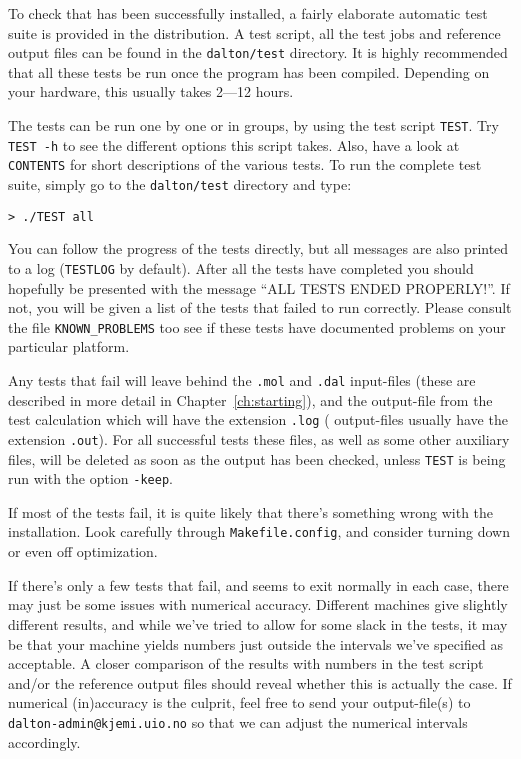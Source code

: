 To check that {\dalton} has been successfully installed, a fairly
elaborate automatic test suite is provided in the distribution. A test
script, all the test jobs and reference output files can be found in
the \verb|dalton/test| directory. It is highly recommended that all
these tests be run once the program has been compiled. Depending on
your hardware, this usually takes 2---12 hours.

The tests can be run one by one or in groups, by using the test script
\verb|TEST|. Try \verb|TEST -h| to see the different options this
script takes. Also, have a look at \verb|CONTENTS|
for short descriptions of the various tests. To run the
complete test suite, simply go to the \verb|dalton/test| directory and
type:
\begin{verbatim}
> ./TEST all
\end{verbatim}
You can follow the progress of the tests directly, but all messages
are also printed to a log (\verb|TESTLOG| by default). After all the
tests have completed you should hopefully be presented with the
message ``ALL TESTS ENDED PROPERLY!''. If not, you will be given a
list of the tests that failed to run correctly. Please consult the file
\verb|KNOWN_PROBLEMS| too see if these tests have documented problems
on your particular platform.

Any tests that fail will leave behind the \verb|.mol| and \verb|.dal|
input-files (these are described in more detail in
Chapter~\ref{ch:starting}), and the output-file from the test
calculation which will have the extension \verb|.log| ({\dalton}
output-files usually have the extension \verb|.out|). For all
successful tests these files, as well as some other auxiliary files,
will be deleted as soon as the output has been checked, unless
\verb|TEST| is being run with the option \verb|-keep|.

If most of the tests fail, it is quite likely that there's something
wrong with the installation. Look carefully through
\verb|Makefile.config|, and consider turning down or even off
optimization.

If there's only a few tests that fail, and {\dalton} seems to exit
normally in each case, there may just be some issues with numerical
accuracy. Different machines give slightly different results, and
while we've tried to allow for some slack in the tests, it may be
that your machine yields numbers just outside the intervals we've
specified as acceptable. A closer comparison of the results with
numbers in the test script and/or the reference output files should
reveal whether this is actually the case. If numerical (in)accuracy is
the culprit, feel free to send your output-file(s) to
\verb|dalton-admin@kjemi.uio.no| so that we can adjust the numerical
intervals accordingly.
